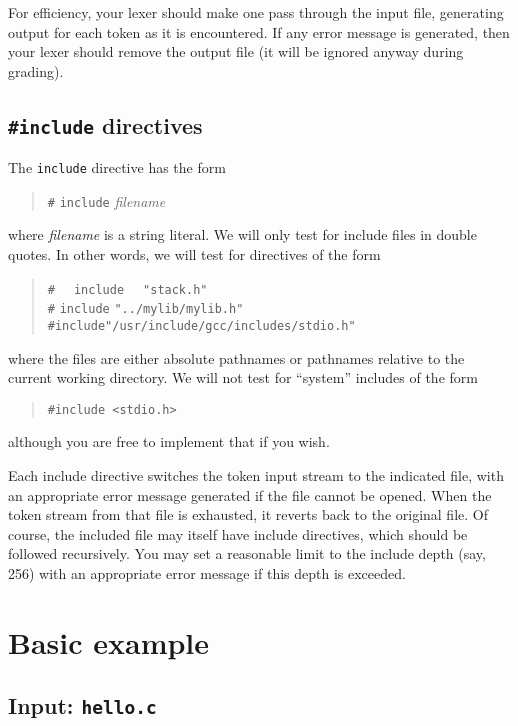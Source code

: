 \documentclass{article}
\begin{document}
For efficiency,
your lexer should make one pass through the input file,
generating output for each token as it is encountered.
If any error message is generated,
then your lexer should remove the output file
(it will be ignored anyway during grading).


\subsection{{\tt \#include} directives}
\label{SEC:include}

The \verb|include| directive has the form
\begin{quote}
  \verb|#| \verb|include| \emph{filename}
\end{quote}
where \emph{filename} is a string literal.
We will only test for include files in double quotes.
In other words, we will test for directives of the form
\begin{quote}
  \verb|#  | \verb|include  | \verb|"stack.h"| \\
  \verb|#| \verb|include| \verb|"../mylib/mylib.h"| \\
  \verb|#include"/usr/include/gcc/includes/stdio.h"|
\end{quote}
where the files are either absolute pathnames or
pathnames relative to the current working directory.
We will not test for ``system'' includes of the form
\begin{quote}
  \verb|#include <stdio.h>|
\end{quote}
although you are free to implement that if you wish.

Each include directive switches the token input stream to the
indicated file,
with an appropriate error message generated if the file cannot be opened.
When the token stream from that file is exhausted,
it reverts back to the original file.
Of course, the included file may itself have include directives,
which should be followed recursively.
You may set a reasonable limit to the include depth (say, 256)
with an appropriate error message if this depth is exceeded.


\section{Basic example}

\subsection{Input: {\tt hello.c}}
\end{document}
